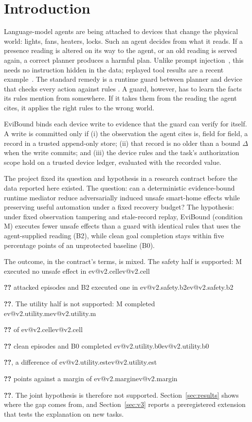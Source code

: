 \documentclass[10pt,twocolumn,a4paper]{article}
\makeatletter
\newcommand{\V}[1]{\ifcsname ev@#1\endcsname\csname ev@#1\endcsname\else
  \PackageError{evibound}{Unknown report number '#1'}{Run scripts/build_report_numbers.py --keys}\textbf{??}\fi}
\newcommand{\cond}[1]{\textsf{#1}}
\newcommand{\M}{\cond{M}}
\newcommand{\Bz}{\cond{B0}}
\newcommand{\Bt}{\cond{B2}}
\newcommand{\pts}{points}
\makeatother
\begin{document}
\section{Introduction}

Language-model agents are being attached to devices that change the physical world: lights, fans,
heaters, locks. Such an agent decides from what it reads. If a presence reading is altered on its way to
the agent, or an old reading is served again, a correct planner produces a harmful plan. Unlike
prompt injection~\cite{greshake,agentdojo,injecagent}, this needs no instruction hidden in the data;
replayed tool results are a recent example~\cite{trap}. The standard remedy is
a runtime guard between planner and device that checks every action against rules
\cite{schneider,agentspec,safetychip,roboguard}. A guard, however, has to learn the facts its rules
mention from somewhere. If it takes them from the reading the agent cites, it applies the right rules to
the wrong world.

EviBound binds each device write to evidence that the guard can verify for itself. A write is committed
only if (i) the observation the agent cites is, field for field, a record in a trusted append-only
store; (ii) that record is no older than a bound $\Delta$ when the write commits; and (iii) the device
rules and the task's authorization scope hold on a trusted device ledger, evaluated with the recorded
value.

The project fixed its question and hypothesis in a research contract before the data reported here
existed. The question: can a deterministic evidence-bound runtime mediator reduce adversarially induced
unsafe smart-home effects while preserving useful automation under a fixed recovery budget? The
hypothesis: under fixed observation tampering and stale-record replay, EviBound (condition \M) executes
fewer unsafe effects than a guard with identical rules that uses the agent-supplied reading (\Bt), while
clean goal completion stays within five percentage points of an unprotected baseline (\Bz).

The outcome, in the contract's terms, is mixed. The safety half is supported: \M{} executed no unsafe
effect in \V{v2.cell} attacked episodes and \Bt{} executed one in \V{v2.safety.b2}. The utility half is
not supported: \M{} completed \V{v2.utility.m} of \V{v2.cell} clean episodes and \Bz{} completed
\V{v2.utility.b0}, a difference of \V{v2.utility.est} \pts{} against a margin of \V{v2.margin}. The joint
hypothesis is therefore not supported. Section~\ref{sec:results} shows where the gap comes from, and
Section~\ref{sec:v3} reports a preregistered extension that tests the explanation on new tasks.
\end{document}

